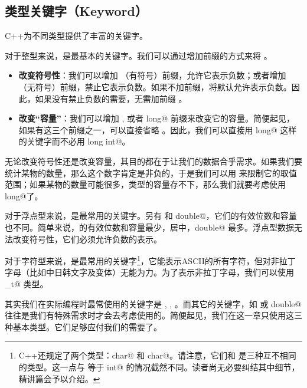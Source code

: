 \subsection*{类型关键字（Keyword）}
C++为不同类型提供了丰富的关键字。\par
对于整型来说，\lstinline@int@ 是最基本的关键字。我们可以通过增加前缀的方式来将 。\par
\begin{itemize}
    \item \textbf{改变符号性}：我们可以增加 \lstinline@signed@（有符号）前缀，允许它表示负数；或者增加 \lstinline@unsigned@（无符号）前缀，禁止它表示负数。如果不加前缀，将默认允许表示负数。因此，如果没有禁止负数的需要，无需加前缀 \lstinline@unsigned@。
    \item \textbf{改变``容量''}：我们可以增加 \lstinline@short@, \lstinline@long@ 或者 \lstinline@long long@ 前缀来改变它的容量。简便起见，如果有这三个前缀之一，可以直接省略 \lstinline@int@。因此，我们可以直接用 \lstinline@long long@ 这样的关键字而不必用 \lstinline@long long int@。
\end{itemize}\par
无论改变符号性还是改变容量，其目的都在于让我们的数据合乎需求。如果我们要统计某物的数量，那么这个数字肯定是非负的，于是我们可以用 \lstinline@unsigned@ 来限制它的取值范围；如果某物的数量可能很多，\lstinline@int@ 类型的容量存不下，那么我们就要考虑使用 \lstinline@long long@了。\par
对于浮点型来说，\lstinline@double@ 是最常用的关键字。另有 \lstinline@float@ 和 \lstinline@long double@，它们的有效位数和容量也不同。简单来说，\lstinline@float@ 的有效位数和容量最少，\lstinline@double@ 居中，\lstinline@long double@ 最多。浮点型数据无法改变符号性，它们必须允许负数的表示。\par
对于字符型来说，\lstinline@char@ 是最常用的关键字\footnote{C++还规定了两个类型：\lstinline@signed char@ 和 \lstinline@unsigned char@。请注意，它们和 \lstinline@char@ 是三种互不相同的类型。这一点与 \lstinline@int@ 等于 \lstinline@signed int@ 的情况截然不同。读者尚无必要纠结其中细节，精讲篇会予以介绍。}，它能表示ASCII的所有字符，但对非拉丁字母（比如中日韩文字及变体）无能为力。为了表示非拉丁字母，我们可以使用 \lstinline@wchar_t@ 类型。\par
其实我们在实际编程时最常使用的关键字是 \lstinline@int@, \lstinline@double@, \lstinline@char@。而其它的关键字，如 \lstinline@unsigned@ 或 \lstinline@long double@ 往往是我们有特殊需求时才会去考虑使用的。简便起见，我们在这一章只使用这三种基本类型。它们足够应付我们的需要了。\par
